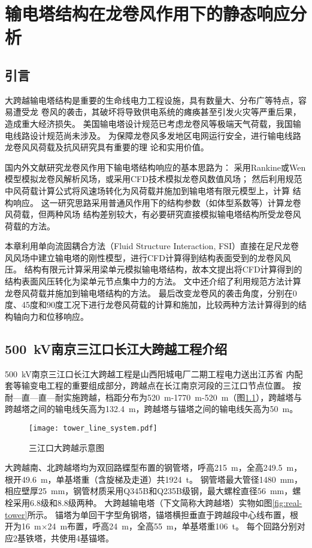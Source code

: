 \graphicspath{{figures/static/}}
\chapter{输电塔结构在龙卷风作用下的静态响应分析}\label{chapter:static}

\section{引言}
大跨越输电塔结构是重要的生命线电力工程设施，具有数量大、分布广等特点，容易遭受龙
卷风的袭击，其破坏将导致供电系统的瘫痪甚至引发火灾等严重后果，造成重大经济损失。
美国输电塔设计规范已考虑龙卷风等极端天气荷载，我国输电线路设计规范尚未涉及。
为保障龙卷风多发地区电网运行安全，进行输电线路龙卷风风荷载及抗风研究具有重要的理
论和实用价值。

国内外文献研究龙卷风作用下输电塔结构响应的基本思路为：
采用Rankine或Wen模型模拟龙卷风解析风场，或采用CFD技术模拟龙卷风数值风场；
然后利用规范中风荷载计算公式将风速场转化为风荷载并施加到输电塔有限元模型上，计算
结构响应。
这一研究思路采用普通风作用下的结构参数（如体型系数等）计算龙卷风荷载，但两种风场
结构差别较大，有必要研究直接模拟输电塔结构所受龙卷风荷载的方法。

本章利用单向流固耦合方法（Fluid Structure Interaction, FSI）直接在足尺龙卷风风场中建立输电塔的刚性模型，进行CFD计算得到结构表面受到的龙卷风风压。
结构有限元计算采用梁单元模拟输电塔结构，故本文提出将CFD计算得到的结构表面风压转化为梁单元节点集中力的方法。
文中还介绍了利用规范方法计算龙卷风荷载并施加到输电塔结构的方法。
最后改变龙卷风的袭击角度，分别在0度、45度和90度工况下进行龙卷风荷载的计算和施加，比较两种方法计算得到的结构轴向力和位移响应。

\section{\SI{500}{kV}南京三江口长江大跨越工程介绍}
\SI{500}{kV}南京三江口长江大跨越工程是山西阳城电厂二期工程电力送出江苏省
内配套等输变电工程的重要组成部分，跨越点在长江南京河段的三江口节点位置。
按耐—直—直—耐实施跨越，档距分布为\SI{520}{m}-\SI{1770}{m}-\SI{520}{m}（图\ref{fig:tower-line}），跨越塔与跨越塔之间的输电线矢高为\SI{132.4}{m}，跨越塔与锚塔之间的输电线矢高为\SI{50}{m}。
\begin{figure}[!htbp]
	\centering
	\texttt{[image: tower\_line\_system.pdf]}
	\caption{三江口大跨越示意图}
	\label{fig:tower-line}
\end{figure}

大跨越南、北跨越塔均为双回路蝶型布置的钢管塔，呼高\SI{215}{m}，全高\SI{249.5}{m}，根开\SI{49.6}{m}，单基塔重（含旋梯及走道）共\SI{1924}{t}。
钢管塔最大管径\SI{1480}{mm}，相应壁厚\SI{25}{mm}，钢管材质采用Q345B和Q235B级钢，最大螺栓直径\SI{56}{mm}，螺栓采用6.8级和8.8级两种。
大跨越输电塔（下文简称大跨越塔）实物如图\ref{fig:real-tower}所示。
锚塔为单回干字型角钢塔，锚塔横担垂直于跨越段中心线布置，根开为\SI{16}{m}$\times$\SI{24}{m}布置，呼高\SI{24}{m}，全高\SI{55}{m}，单基塔重\SI{106}{t}。
每个回路分别对应2基铁塔，共使用4基锚塔。

